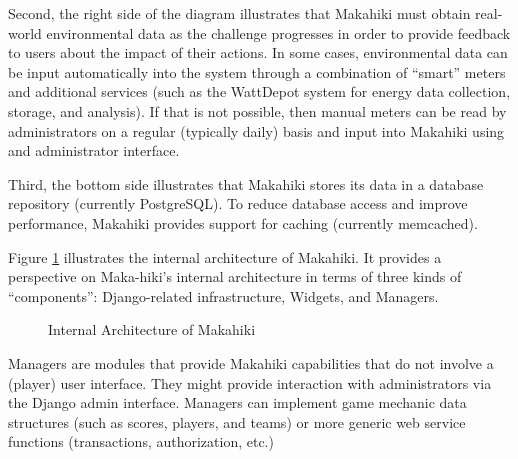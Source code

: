 Second, the right side of the diagram illustrates that Makahiki must obtain real-world environmental data as the challenge progresses in order to provide feedback to users about the impact of their actions. In some cases, environmental data can be input automatically into the system through a combination of ``smart'' meters and additional services (such as the WattDepot system for energy data collection, storage, and analysis). If that is not possible, then manual meters can be read by administrators on a regular (typically daily) basis and input into Makahiki using and administrator interface.

Third, the bottom side illustrates that Makahiki stores its data in a database repository (currently PostgreSQL). To reduce database access and improve performance, Makahiki provides support for caching (currently memcached).

Figure \ref{fig:makahiki-internal-architecture} illustrates the internal architecture of Makahiki. It provides a perspective on Maka-hiki's internal architecture in terms of three kinds of ``components'': Django-related infrastructure, Widgets, and Managers.

\begin{figure}[!ht]
\begin{center}
\end{center}
\caption{Internal Architecture of Makahiki}
\label{fig:makahiki-internal-architecture}
\end{figure}

Managers are modules that provide Makahiki capabilities that do not involve a (player) user interface. They might provide interaction with administrators via the Django admin interface. Managers can implement game mechanic data structures (such as scores, players, and teams) or more generic web service functions (transactions, authorization, etc.)

